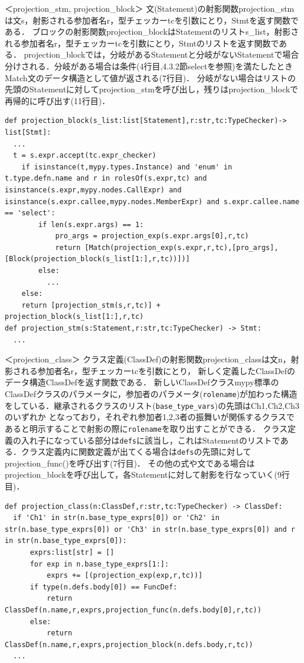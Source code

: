 \documentclass{thesis}
\begin{document}
＜projection\_stm, projection\_block＞
文(Statement)の射影関数projection\_stmは文\textsf{s}，射影される参加者名\textsf{r}，型チェッカー\textsf{tc}を引数にとり，\textsf{Stmt}を返す関数である．
ブロックの射影関数projection\_blockはStatementのリスト\textsf{s\_list}，射影される参加者名\textsf{r}，型チェッカー\textsf{tc}を引数にとり，\textsf{Stmt}のリストを返す関数である．
projection\_blockでは，分岐があるStatementと分岐がないStatementで場合分けされる．分岐がある場合は条件(4行目,4.3.2節selectを参照)を満たしたときMatch文のデータ構造として値が返される(7行目)．
分岐がない場合はリストの先頭のStatementに対してprojection\_stmを呼び出し，残りはprojection\_blockで再帰的に呼び出す(11行目)．
\begin{lstlisting}[caption=pro\_s.py]
def projection_block(s_list:list[Statement],r:str,tc:TypeChecker)-> list[Stmt]:
  ... 
  t = s.expr.accept(tc.expr_checker) 
    if isinstance(t,mypy.types.Instance) and 'enum' in t.type.defn.name and r in rolesOf(s.expr,tc) and isinstance(s.expr,mypy.nodes.CallExpr) and isinstance(s.expr.callee,mypy.nodes.MemberExpr) and s.expr.callee.name == 'select':
        if len(s.expr.args) == 1:
            pro_args = projection_exp(s.expr.args[0],r,tc)
            return [Match(projection_exp(s.expr,r,tc),[pro_args],[Block(projection_block(s_list[1:],r,tc))])]
        else:
          ... 
    else:
    return [projection_stm(s,r,tc)] + projection_block(s_list[1:],r,tc) 
def projection_stm(s:Statement,r:str,tc:TypeChecker) -> Stmt:
  ... 
\end{lstlisting}
＜projection\_class＞
クラス定義(ClassDef)の射影関数projection\_classは文\textsf{n}，射影される参加者名\textsf{r}，型チェッカー\textsf{tc}を引数にとり， 新しく定義したClassDefのデータ構造\textsf{ClassDef}を返す関数である．
新しいClassDefクラスmypy標準のClassDefクラスのパラメータに，参加者のパラメータ(\texttt{rolename})が加わった構造をしている．継承されるクラスのリスト(\texttt{base\_type\_vars})の先頭はCh1,Ch2,Ch3のいずれか
となっており，それぞれ参加者1,2,3者の振舞いが関係するクラスであると明示することで射影の際に\texttt{rolename}を取り出すことができる．
クラス定義の入れ子になっている部分は\texttt{defs}に該当し，これはStatementのリストである．クラス定義内に関数定義が出てくる場合は\texttt{defs}の先頭に対してprojection\_func()を呼び出す(7行目)．
その他の式や文である場合はprojection\_blockを呼び出して，各Statementに対して射影を行なっていく(9行目)．
\begin{lstlisting}[caption=pro\_class.py]
def projection_class(n:ClassDef,r:str,tc:TypeChecker) -> ClassDef:
  if 'Ch1' in str(n.base_type_exprs[0]) or 'Ch2' in str(n.base_type_exprs[0]) or 'Ch3' in str(n.base_type_exprs[0]) and r in str(n.base_type_exprs[0]):
      exprs:list[str] = []
      for exp in n.base_type_exprs[1:]:
          exprs += [(projection_exp(exp,r,tc))]
      if type(n.defs.body[0]) == FuncDef: 
          return ClassDef(n.name,r,exprs,projection_func(n.defs.body[0],r,tc))
      else: 
          return ClassDef(n.name,r,exprs,projection_block(n.defs.body,r,tc))
  ... 
\end{lstlisting}
\end{document}
